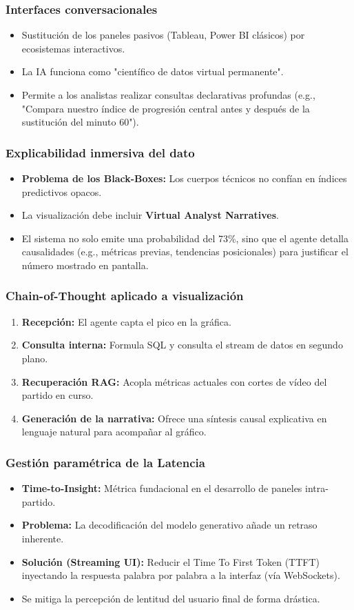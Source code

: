 \documentclass[aspectratio=169]{beamer}
\begin{document}
\begin{frame}\frametitle{Interfaces conversacionales}
\begin{itemize}
    \item Sustitución de los paneles pasivos (Tableau, Power BI clásicos) por ecosistemas interactivos.
    \item La IA funciona como "científico de datos virtual permanente".
    \item Permite a los analistas realizar consultas declarativas profundas (e.g., "Compara nuestro índice de progresión central antes y después de la sustitución del minuto 60").
\end{itemize}
\end{frame}

\begin{frame}\frametitle{Explicabilidad inmersiva del dato}
\begin{itemize}
    \item \textbf{Problema de los Black-Boxes:} Los cuerpos técnicos no confían en índices predictivos opacos.
    \item La visualización debe incluir \textbf{Virtual Analyst Narratives}.
    \item El sistema no solo emite una probabilidad del 73\%, sino que el agente detalla causalidades (e.g., métricas previas, tendencias posicionales) para justificar el número mostrado en pantalla.
\end{itemize}
\end{frame}

\begin{frame}\frametitle{Chain-of-Thought aplicado a visualización}
\begin{enumerate}
    \item \textbf{Recepción:} El agente capta el pico en la gráfica.
    \item \textbf{Consulta interna:} Formula SQL y consulta el stream de datos en segundo plano.
    \item \textbf{Recuperación RAG:} Acopla métricas actuales con cortes de vídeo del partido en curso.
    \item \textbf{Generación de la narrativa:} Ofrece una síntesis causal explicativa en lenguaje natural para acompañar al gráfico.
\end{enumerate}
\end{frame}

\begin{frame}\frametitle{Gestión paramétrica de la Latencia}
\begin{itemize}
    \item \textbf{Time-to-Insight:} Métrica fundacional en el desarrollo de paneles intra-partido.
    \item \textbf{Problema:} La decodificación del modelo generativo añade un retraso inherente.
    \item \textbf{Solución (Streaming UI):} Reducir el Time To First Token (TTFT) inyectando la respuesta palabra por palabra a la interfaz (vía WebSockets).
    \item Se mitiga la percepción de lentitud del usuario final de forma drástica.
\end{itemize}
\end{frame}
\end{document}
